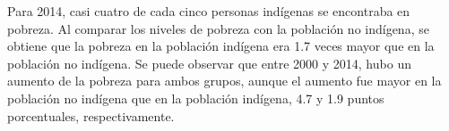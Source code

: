 Para 2014, casi cuatro de cada cinco personas indígenas se encontraba en pobreza. Al comparar los niveles de pobreza con la población no indígena, se obtiene que la pobreza en la población indígena era 1.7 veces mayor que en la población no indígena. Se puede observar que entre 2000 y 2014, hubo un aumento de la pobreza para ambos grupos, aunque el aumento fue mayor en la población no indígena que en la población indígena, 4.7 y 1.9 puntos porcentuales, respectivamente.